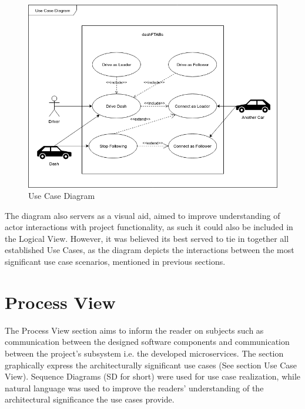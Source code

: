 \documentclass[12pt]{article}
\begin{document}
\FloatBarrier %
\begin{figure}[ht!]
\centering
\includegraphics[width=\linewidth]{Diagrams/UseCaseDiagram.png}
\caption{Use Case Diagram}
\label{fig:usecasediagram}
\end{figure}
\FloatBarrier %
The diagram also servers as a visual aid, aimed to improve understanding of actor interactions with project functionality, as such it could also be included in the Logical View. However, it was believed its best served to tie in together all established Use Cases, as the diagram depicts the interactions between the most significant use case scenarios, mentioned in previous sections.
 
\pagebreak
\section{Process View}
The Process View section aims to inform the reader on subjects such as communication between the designed software components and communication between the project's subsystem i.e. the developed microservices. The section graphically express the architecturally significant use cases (See section Use Case View). Sequence Diagrams (SD for short) were used for use case realization, while natural language was used to improve the readers’ understanding of the architectural significance the use cases provide.\par
\end{document}
